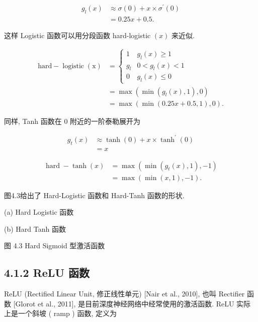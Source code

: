 \documentclass[10pt]{article}
\begin{document}
\begin{align*}
g_{l}(x) & \approx \sigma(0)+x \times \sigma^{\prime}(0)  \tag{4.7}\\
& =0.25 x+0.5 . \tag{4.8}
\end{align*}


这样 Logistic 函数可以用分段函数 hard-logistic $(x)$ 来近似.


\begin{align*}
\operatorname{hard-\operatorname {logistic}(x)} & = \begin{cases}1 & g_{l}(x) \geq 1 \\
g_{l} & 0<g_{l}(x)<1 \\
0 & g_{l}(x) \leq 0\end{cases}  \tag{4.9}\\
& =\max \left(\min \left(g_{l}(x), 1\right), 0\right)  \tag{4.10}\\
& =\max (\min (0.25 x+0.5,1), 0) . \tag{4.11}
\end{align*}


同样, Tanh 函数在 0 附近的一阶泰勒展开为


\begin{align*}
g_{t}(x) & \approx \tanh (0)+x \times \tanh ^{\prime}(0)  \tag{4.12}\\
& =x \tag{4.13}
\end{align*}





\begin{align*}
\operatorname{hard}-\tanh (x) & =\max \left(\min \left(g_{t}(x), 1\right),-1\right)  \tag{4.14}\\
& =\max (\min (x, 1),-1) . \tag{4.15}
\end{align*}


图4.3给出了 Hard-Logistic 函数和 Hard-Tanh 函数的形状.



(a) Hard Logistic 函数



(b) Hard Tanh 函数

图 4.3 Hard Sigmoid 型激活函数

\subsection*{4.1.2 ReLU 函数}
ReLU (Rectified Linear Unit, 修正线性单元) [Nair et al., 2010], 也叫 Rectifier 函数 [Glorot et al., 2011], 是目前深度神经网络中经常使用的激活函数. ReLU 实际上是一个斜坡 ( ramp ) 函数, 定义为
\end{document}
